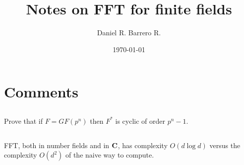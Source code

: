\documentclass{amsart}
\title{Notes on FFT for finite fields}
\author{Daniel R. Barrero R.}
\date{\today}
\begin{document}
\maketitle

\section{} %



\section{Comments}

\subsection{} Prove that if $F = GF(p^n)$ then $F^*$ is cyclic of order
$p^n - 1$.

\subsection{} FFT, both in number fields and in $\mathbf{C}$, has complexity
$O(d \log d)$ versus the complexity $O(d^2)$ of the naive way to compute.



%
\end{document}
